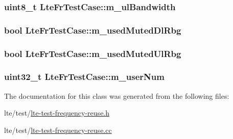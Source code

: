 \subsubsection[{\texorpdfstring{m\+\_\+ul\+Bandwidth}{m_ulBandwidth}}]{\setlength{\rightskip}{0pt plus 5cm}uint8\+\_\+t Lte\+Fr\+Test\+Case\+::m\+\_\+ul\+Bandwidth\hspace{0.3cm}{\ttfamily [protected]}}\hypertarget{classLteFrTestCase_abc41d1a6e64783aec279b400fc5e0076}{}\label{classLteFrTestCase_abc41d1a6e64783aec279b400fc5e0076}
\subsubsection[{\texorpdfstring{m\+\_\+used\+Muted\+Dl\+Rbg}{m_usedMutedDlRbg}}]{\setlength{\rightskip}{0pt plus 5cm}bool Lte\+Fr\+Test\+Case\+::m\+\_\+used\+Muted\+Dl\+Rbg\hspace{0.3cm}{\ttfamily [protected]}}\hypertarget{classLteFrTestCase_a57b4d14dd22adfb64572dce3602703e2}{}\label{classLteFrTestCase_a57b4d14dd22adfb64572dce3602703e2}
\subsubsection[{\texorpdfstring{m\+\_\+used\+Muted\+Ul\+Rbg}{m_usedMutedUlRbg}}]{\setlength{\rightskip}{0pt plus 5cm}bool Lte\+Fr\+Test\+Case\+::m\+\_\+used\+Muted\+Ul\+Rbg\hspace{0.3cm}{\ttfamily [protected]}}\hypertarget{classLteFrTestCase_ae54b6fb11ce52cc697928f18f6a4e6c2}{}\label{classLteFrTestCase_ae54b6fb11ce52cc697928f18f6a4e6c2}
\subsubsection[{\texorpdfstring{m\+\_\+user\+Num}{m_userNum}}]{\setlength{\rightskip}{0pt plus 5cm}uint32\+\_\+t Lte\+Fr\+Test\+Case\+::m\+\_\+user\+Num\hspace{0.3cm}{\ttfamily [protected]}}\hypertarget{classLteFrTestCase_a0fd46ca7afd0126775b0dfe0e082d634}{}\label{classLteFrTestCase_a0fd46ca7afd0126775b0dfe0e082d634}


The documentation for this class was generated from the following files\+:\begin{DoxyCompactItemize}
\item 
lte/test/\hyperlink{lte-test-frequency-reuse_8h}{lte-\/test-\/frequency-\/reuse.\+h}\item 
lte/test/\hyperlink{lte-test-frequency-reuse_8cc}{lte-\/test-\/frequency-\/reuse.\+cc}\end{DoxyCompactItemize}
